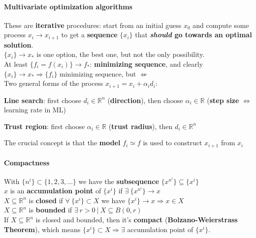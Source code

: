 \documentclass[10pt]{report}
\begin{document}
\paragraph{Multivariate optimization algorithms} These are \textbf{iterative} procedures: start from an initial guess $x_0$ and compute some process $x_i \longrightarrow x_{i+1}$ to get a \textbf{sequence} $\{x_i\}$ that \textbf{\textit{should} go towards an optimal solution}.\\
$\{x_i\}\rightarrow x_*$ is one option, the best one, but not the only possibility.\\
At least $\{f_i = f(x_i)\} \rightarrow f_*$: \textbf{minimizing sequence}, and clearly $\{x_i\}\rightarrow x_* \Rightarrow \{f_i\}$ minimizing sequence, but $\not\Leftarrow$\\
Two general forms of the process $x_{i+1} = x_i + \alpha_id_i$:
\begin{list}{}{}
	\item \textbf{Line search}: first choose $d_i\in \mathbb{R}^n$ (\textbf{direction}), then choose $\alpha_i\in \mathbb{R}$ (\textbf{step size} $\Leftrightarrow$ learning rate in ML)
	\item \textbf{Trust region}: first choose $\alpha_i\in \mathbb{R}$ (\textbf{trust radius}), then $d_i\in \mathbb{R}^n$
\end{list}
The crucial concept is that the \textbf{model} $f_i \simeq f$ is used to construct $x_{i+1}$ from $x_i$
\paragraph{Compactness}
With $\{n^i\}\subset\{1,2,3,\ldots\}$ we have the \textbf{subsequence} $\{x^{n^i}\}\subseteq\{x^i\}$\\
$x$ is an \textbf{accumulation point} of $\{x^i\}$ if $\exists\:\{x^{n^i}\}\rightarrow x$\\
$X\subseteq\mathbb{R}^n$ is \textbf{closed} if $\forall\:\{x^i\}\subset X$ we have $\{x^i\}\rightarrow x\Rightarrow x\in X$\\
$X\subseteq\mathbb{R}^n$ is \textbf{bounded} if $\exists\:r>0\:|\:X\subseteq B(0,r)$\\
If $X\subseteq\mathbb{R}^n$ is closed and bounded, then it's \textbf{compact} (\textbf{Bolzano-Weierstrass Theorem}), which means $\{x^i\}\subset X\Rightarrow\exists$ accumulation point of $\{x^i\}$.
\end{document}
